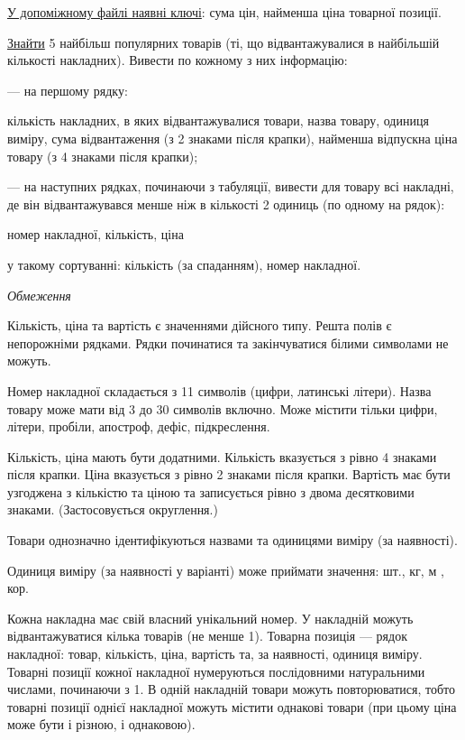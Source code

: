 \documentclass[11pt, ukrainian]{article}
\begin{document}
\underline{У допоміжному файлі наявні ключі}: сума цін, найменша ціна товарної позиції.

\underline{Знайти} 5 найбільш популярних товарів (ті, що відвантажувалися в найбільшій кількості накладних). Вивести по кожному з них інформацію:\par
{\noindent}--- на першому рядку:\par
кількість накладних, в яких відвантажувалися товари, назва товару, одиниця виміру, сума відвантаження (з 2 знаками після крапки), найменша відпускна ціна товару (з 4 знаками після крапки);

{\noindent}--- на наступних рядках, починаючи з табуляції, вивести для товару всі накладні, де він відвантажувався менше ніж в кількості 2 одиниць (по одному на рядок):\par
номер накладної, кількість, ціна

{\noindent}у такому сортуванні: кількість (за спаданням), номер накладної.


\bigskip\textit{Обмеження}

Кількість, ціна та вартість є значеннями дійсного типу.
Решта полів є непорожніми рядками.
Рядки починатися та закінчуватися білими символами не можуть.

Номер накладної складається з 11 символів (цифри, латинські літери).
Назва товару може мати від 3 до 30 символів включно.
Може містити тільки цифри, літери, пробіли, апостроф, дефіс, підкреслення.

Кількість, ціна мають бути додатними.
Кількість вказується з рівно 4 знаками після крапки.
Ціна вказується з рівно 2 знаками після крапки.
Вартість має бути узгоджена з кількістю та ціною та записується рівно з двома десятковими знаками.
(Застосовується округлення.)

Товари однозначно ідентифікуються назвами та одиницями виміру (за наявності).

Одиниця виміру (за наявності у варіанті) може приймати значення: шт., кг, м , кор.

Кожна накладна має свій власний унікальний номер.
У накладній можуть відвантажуватися кілька товарів (не менше 1).
Товарна позиція --- рядок накладної: товар, кількість, ціна, вартість та, за наявності, одиниця виміру.
Товарні позиції кожної накладної нумеруються послідовними натуральними числами, починаючи з 1.
В одній накладній товари можуть повторюватися, 
тобто товарні позиції однієї накладної можуть містити однакові товари 
(при цьому ціна може бути і різною, і однаковою).
\end{document}

